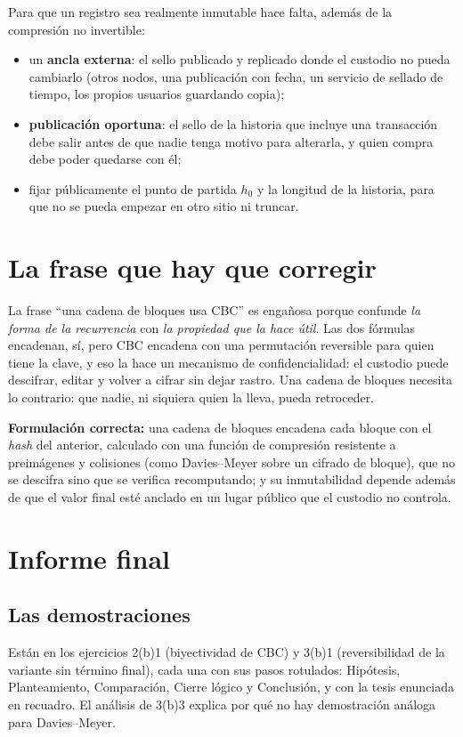 \documentclass[11pt,letterpaper]{article}
\begin{document}
Para que un registro sea realmente inmutable hace falta, además de la compresión no invertible:
\begin{itemize}[itemsep=1pt]
  \item un \textbf{ancla externa}: el sello publicado y replicado donde el custodio no pueda cambiarlo (otros nodos,
        una publicación con fecha, un servicio de sellado de tiempo, los propios usuarios guardando copia);
  \item \textbf{publicación oportuna}: el sello de la historia que incluye una transacción debe salir antes de que
        nadie tenga motivo para alterarla, y quien compra debe poder quedarse con él;
  \item fijar públicamente el punto de partida $h_0$ y la longitud de la historia, para que no se pueda empezar
        en otro sitio ni truncar.
\end{itemize}

\section{La frase que hay que corregir}

La frase ``una cadena de bloques usa CBC'' es engañosa porque confunde \emph{la forma de la recurrencia} con
\emph{la propiedad que la hace útil}. Las dos fórmulas encadenan, sí, pero CBC encadena con una permutación
reversible para quien tiene la clave, y eso la hace un mecanismo de confidencialidad: el custodio puede descifrar,
editar y volver a cifrar sin dejar rastro. Una cadena de bloques necesita lo contrario: que nadie, ni siquiera
quien la lleva, pueda retroceder.

\textbf{Formulación correcta:} una cadena de bloques encadena cada bloque con el \emph{hash} del anterior, calculado con
una función de compresión resistente a preimágenes y colisiones (como Davies--Meyer sobre un cifrado de bloque), que
no se descifra sino que se verifica recomputando; y su inmutabilidad depende además de que el valor final esté anclado
en un lugar público que el custodio no controla.

\section{Informe final}

\subsection{Las demostraciones}
Están en los ejercicios 2(b)1 (biyectividad de CBC) y 3(b)1 (reversibilidad de la variante sin término final),
cada una con sus pasos rotulados: Hipótesis, Planteamiento, Comparación, Cierre lógico y Conclusión, y con la tesis
enunciada en recuadro. El análisis de 3(b)3 explica por qué no hay demostración análoga para Davies--Meyer.
\end{document}
